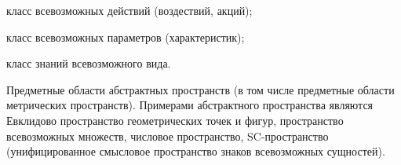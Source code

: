 \begin{SCn}
\begin{scnsubstruct}
\begin{scnsubstruct}
{\begin{scnitemize}
\begin{scnitemizeii}
                        \item класс всевозможных действий (воздествий, акций);
                        \item класс всевозможных параметров (характеристик);
                        \item класс знаний всевозможного вида.
                    \end{scnitemizeii}
                    \item Предметные области абстрактных пространств (в том числе предметные области метрических пространств). Примерами абстрактного пространства являются Евклидово пространство геометрических точек и фигур, пространство всевозможных множеств, числовое пространство, SC-пространство (унифицированное смысловое пространство знаков всевозможных сущностей).
                \end{scnitemize}}
            

\end{scnsubstruct}
\end{scnsubstruct}
\end{SCn}
